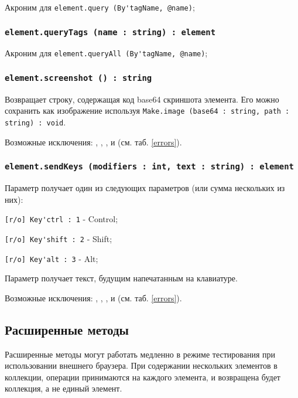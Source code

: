 Акроним для \lstinline|element.query (By'tagName, @name)|;

\subsubsection{\lstinline|element.queryTags (name : string) : element|}

Акроним для \lstinline|element.queryAll (By'tagName, @name)|;

\subsubsection{\lstinline|element.screenshot () : string|}

Возвращает строку, содержащая код base64 скриншота элемента. Его можно сохранить как изображение используя \lstinline|Make.image (base64 : string, path : string) : void|.

Возможные исключения: , , ,  и  (см. таб. \ref{errors}).

\subsubsection{\lstinline|element.sendKeys (modifiers : int, text : string) : element|}

Параметр  получает один из следующих параметров (или сумма нескольких из них):
\begin{icItems}
	\item \lstinline|[r/o] Key'ctrl : 1| - Control;
	\item \lstinline|[r/o] Key'shift : 2| - Shift;
	\item \lstinline|[r/o] Key'alt : 3| - Alt;
\end{icItems}

Параметр  получает текст, будущим напечатанным на клавиатуре.

Возможные исключения: , , ,   и  (см. таб. \ref{errors}).

\subsection{Расширенные методы}

Расширенные методы могут работать медленно в режиме тестирования при использовании внешнего браузера. При содержании нескольких элементов в коллекции, операции принимаются на каждого элемента, и возвращена будет коллекция, а не единый элемент.

